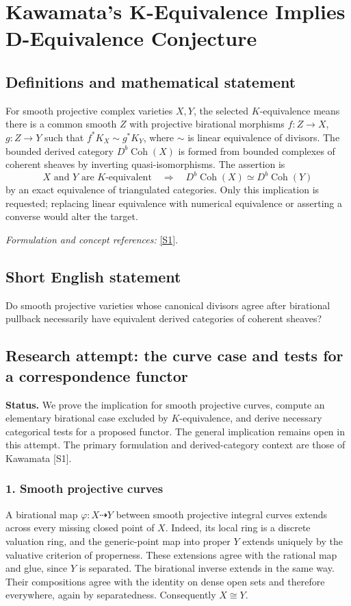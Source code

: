\documentclass[11pt]{article}
\begin{document}
\section*{\texorpdfstring{Kawamata's K-Equivalence Implies D-Equivalence Conjecture}{Kawamata's K-Equivalence Implies D-Equivalence Conjecture}}\label{30006804}
\subsection{Definitions and mathematical statement}
For smooth projective complex varieties $X,Y$, the selected $K$-equivalence means there is a common smooth $Z$ with projective birational morphisms $f:Z\to X$, $g:Z\to Y$ such that
$f^*K_X\sim g^*K_Y$, where $\sim$ is linear equivalence of divisors. The bounded derived category $D^b\operatorname{Coh}(X)$ is formed from bounded complexes of coherent sheaves by inverting quasi-isomorphisms. The assertion is
\[
 X\text{ and }Y\text{ are }K\text{-equivalent}
 \quad\Longrightarrow\quad D^b\operatorname{Coh}(X)\simeq D^b\operatorname{Coh}(Y)
\]
by an exact equivalence of triangulated categories. Only this implication is requested; replacing linear equivalence with numerical equivalence or asserting a converse would alter the target.
\par\smallskip\textit{Formulation and concept references:} \href{https://arxiv.org/abs/math/0205287}{[S1]}.

\subsection{Short English statement}
Do smooth projective varieties whose canonical divisors agree after birational pullback necessarily have equivalent derived categories of coherent sheaves?
\subsection{Research attempt: the curve case and tests for a correspondence functor}
\textbf{Status.} We prove the implication for smooth projective curves, compute an elementary birational case excluded by $K$-equivalence, and derive necessary categorical tests for a proposed functor. The general implication remains open in this attempt. The primary formulation and derived-category context are those of Kawamata [S1].

\subsubsection{1. Smooth projective curves}
A birational map $\varphi:X\dashrightarrow Y$ between smooth projective integral curves extends across every missing closed point of $X$. Indeed, its local ring is a discrete valuation ring, and the generic-point map into proper $Y$ extends uniquely by the valuative criterion of properness. These extensions agree with the rational map and glue, since $Y$ is separated. The birational inverse extends in the same way. Their compositions agree with the identity on dense open sets and therefore everywhere, again by separatedness. Consequently $X\cong Y$.
\end{document}
